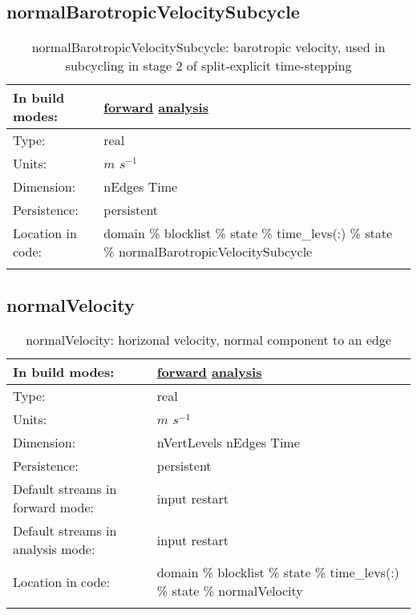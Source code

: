 \subsection[normalBarotropicVelocitySubcycle]{normalBarotropicVelocitySubcycle}
\label{subsec:var_sec_state_normalBarotropicVelocitySubcycle}
\begin{center}
\begin{longtable}{| p{2.0in} | p{4.0in} |}
        \hline 
        In build modes: & \hyperref[subsec:forward_var_tab_state]{forward} \hyperref[subsec:analysis_var_tab_state]{analysis} \\
        \hline 
        Type: & real \\
        \hline 
        Units: & $m$ $s^{-1}$ \\
        \hline 
        Dimension: & nEdges Time \\
        \hline 
        Persistence: & persistent \\
        \hline 
		 Location in code: & domain \% blocklist \% state \% time\_levs(:) \% state \% normalBarotropicVelocitySubcycle \\
		 \hline 
    \caption{normalBarotropicVelocitySubcycle: barotropic velocity, used in subcycling in stage 2 of split-explicit time-stepping}
\end{longtable}
\end{center}
\subsection[normalVelocity]{normalVelocity}
\label{subsec:var_sec_state_normalVelocity}
\begin{center}
\begin{longtable}{| p{2.0in} | p{4.0in} |}
        \hline 
        In build modes: & \hyperref[subsec:forward_var_tab_state]{forward} \hyperref[subsec:analysis_var_tab_state]{analysis} \\
        \hline 
        Type: & real \\
        \hline 
        Units: & $m$ $s^{-1}$ \\
        \hline 
        Dimension: & nVertLevels nEdges Time \\
        \hline 
        Persistence: & persistent \\
        \hline 
		 Default streams in forward mode: &  input restart \\
        \hline 
		 Default streams in analysis mode: &  input restart \\
        \hline 
		 Location in code: & domain \% blocklist \% state \% time\_levs(:) \% state \% normalVelocity \\
		 \hline 
    \caption{normalVelocity: horizonal velocity, normal component to an edge}
\end{longtable}
\end{center}
